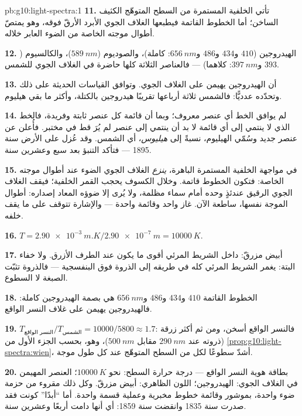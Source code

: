 \begin{solution}{pb:g10:light-spectra:1}
\textbf{11.} تأتي الخلفية المستمرة من السطح المتوهّج الكثيف
الساخن؛ أما الخطوط القاتمة فيطبعها الغلاف الجوي الأبرد الأرقّ
فوقه، وهو يمتصّ أطوال موجته الخاصة من الضوء العابر
خلاله.

\textbf{12.} الهيدروجين ($410$ و$434$ و$486$ و$\qty{656}{nm}$: كاملة)،
والصوديوم ($\qty{589}{nm}$)، والكالسيوم ($393$ و$\qty{397}{nm}$: كلاهما)
--- فالعناصر الثلاثة كلها حاضرة في الغلاف الجوي للشمس.

\textbf{13.} أن الهيدروجين يهيمن على الغلاف الجوي. وتوافق القياسات
الحديثة على ذلك وتحدّده عدديًّا: فالشمس ثلاثة أرباعها تقريبًا
هيدروجين بالكتلة، وأكثر ما بقي هيليوم.

\textbf{14.} لم يوافق الخط أي عنصر معروف؛ وبما أن قائمة كل عنصر
ثابتة وفريدة، فالخط الذي لا ينتمي إلى أي قائمة لا بد أن ينتمي
إلى عنصر لم يُرَ قط في مختبر. فأُعلن عن عنصر جديد
وسُمّي الهيليوم، نسبةً إلى \emph{هيليوس}، أي الشمس. وقد
عُزل على الأرض سنة 1895 --- فتأكد التنبؤ بعد سبع وعشرين
سنة.

\textbf{15.} في مواجهة الخلفية المستمرة الباهرة، \emph{ينزع}
الغلاف الجوي الضوء عند أطوال موجته الخاصة: فتكون الخطوط قاتمة.
وخلال الكسوف يحجب القمر الخلفية؛ فيقف الغلاف الجوي الرقيق
عندئذٍ وحده أمام سماء مظلمة، ولا يُرى إلا ضوؤه المعاد إصداره:
أطوال الموجة نفسها، ساطعة الآن. غاز واحد وقائمة واحدة
--- والإشارة تتوقف على ما يقف خلفه.

\textbf{16.} $T = \qty{2.90e-3}{m.K} / \qty{2.90e-7}{m}
= \qty{10000}{K}$.

\textbf{17.} أبيض مزرقّ:  داخل الشريط المرئي أقوى ما يكون
عند الطرف الأزرق. ولا خفاء البتة: 
يغمر الشريط المرئي كله في طريقه إلى الذروة فوق البنفسجية ---
فالذروة تثبّت الصبغة لا السطوع.

\textbf{18.} الخطوط القاتمة $410$ و$434$ و$486$ و$\qty{656}{nm}$ هي
بصمة الهيدروجين كاملة: فالهيدروجين يهيمن على غلاف النسر الواقع.

\textbf{19.} $T_{\text{النسر الواقع}} / T_{\text{الشمس}} = 10000 / 5800 \approx
1.7$: فالنسر الواقع أسخن، ومن ثم أكثر زرقة (ذروته عند $\qty{290}{nm}$ مقابل
$\qty{500}{nm}$)، وهو، بحسب الجزء الأول من
\cref{prop:g10:light-spectra:wien}، أشدّ سطوعًا لكل  من السطح المتوهّج
عند كل طول موجة.

\textbf{20.} بطاقة هوية النسر الواقع --- درجة حرارة السطح: نحو
$\qty{10000}{K}$؛ العنصر المهيمن في الغلاف الجوي: الهيدروجين؛ اللون
الظاهري: أبيض مزرقّ. وكل ذلك مقروء من حزمة ضوء واحدة، بموشور
وقائمة خطوط مخبرية وعملية قسمة واحدة. أما ``أبدًا'' كونت فقد
صدرت سنة 1835 وانقضت سنة 1859: أي أنها دامت أربعًا وعشرين سنة.
\end{solution}
